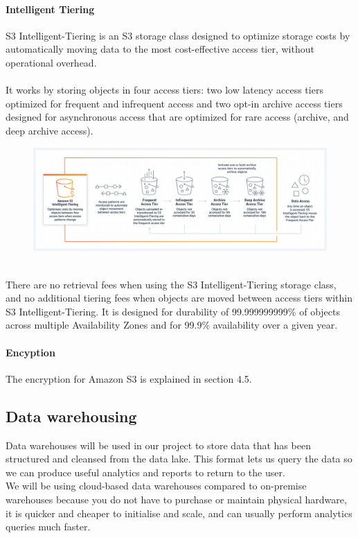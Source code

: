 \documentclass[10pt]{article}
\begin{document}
\paragraph{Intelligent Tiering}
S3 Intelligent-Tiering \cite{S3-storage-classes} is an S3 storage class designed to optimize storage costs by automatically moving data to the most cost-effective access tier, without operational overhead.\\ \\
It works by storing objects in four access tiers: two low latency access tiers optimized for frequent and infrequent access and two opt-in archive access tiers designed for asynchronous access that are optimized for rare access (archive, and deep archive access).\\
\begin{figure}[h!]
   	\centering
   	\includegraphics[width=1\linewidth]{images/S3-Intelligent-Tiering.png}	
\end{figure} \\
There are no retrieval fees when using the S3 Intelligent-Tiering storage class, and no additional tiering fees when objects are moved between access tiers within S3 Intelligent-Tiering. It is designed for durability of 99.999999999\% of objects across multiple Availability Zones and for 99.9\% availability over a given year.
\paragraph{Encyption} The encryption for Amazon S3 is explained in section 4.5. 

\newpage
\subsection{Data warehousing}
Data warehouses will be used in our project to store data that has been structured and cleansed from the data lake. This format lets us query the data so we can produce useful analytics and reports to return to the user.
\\
We will be using cloud-based data warehouses compared to on-premise warehouses because you do not have to purchase or maintain physical hardware, it is quicker and cheaper to initialise and scale, and can usually perform analytics queries much faster.
\end{document}
